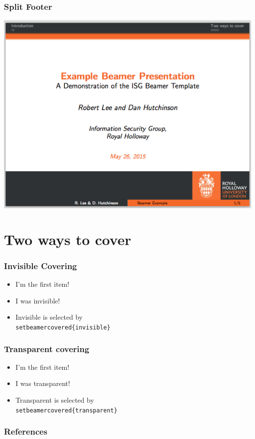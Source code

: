 \documentclass{beamer}
\begin{document}
\begin{frame}\frametitle{Split Footer}
\begin{center}
	\includegraphics[scale=0.4]{graphics/split-footer.png}
\end{center}
\end{frame}

\section{Two ways to cover}
\begin{frame}\frametitle{Invisible Covering}
\begin{itemize}
\item{I'm the first item!}
\pause
\item{I was invisible!}
\pause
\item Invisible is selected by \texttt{\\setbeamercovered\{invisible\}}
\end{itemize}
\end{frame}


\begin{frame}\frametitle{Transparent covering}
\begin{itemize}
\item{I'm the first item!}
\pause
\item{I was transparent!}
\pause
\item Transparent is selected by \texttt{\\setbeamercovered\{transparent\}}
\end{itemize}
\end{frame}

\begin{frame}[allowframebreaks]
\frametitle{References}

\end{frame}
\end{document}
